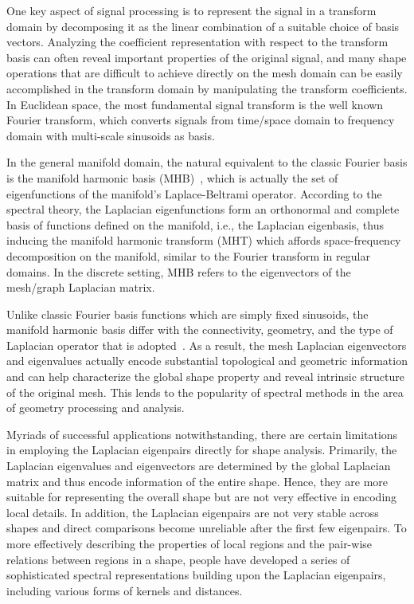 One key aspect of signal processing is to represent the signal in a transform
domain by decomposing it as the linear combination of a suitable choice of basis
vectors. Analyzing the coefficient representation with respect to the transform
basis can often reveal important properties of the original signal, and many
shape operations that are difficult to achieve directly on the mesh domain
can be easily accomplished in the transform domain by manipulating the
transform coefficients. In Euclidean space, the most fundamental signal transform
is the well known Fourier transform, which converts signals from time/space domain to
frequency domain with multi-scale sinusoids as basis.

In the general manifold domain, the natural equivalent to the classic Fourier basis is
the manifold harmonic basis (MHB)~\cite{Vallet2008}, which is actually the set
of eigenfunctions of the manifold's Laplace-Beltrami operator.
According to the spectral theory, the Laplacian eigenfunctions form an orthonormal and complete
basis of functions defined on the manifold, i.e., the Laplacian eigenbasis, thus inducing the
manifold harmonic transform (MHT) which affords space-frequency decomposition on the manifold, similar
to the Fourier transform in regular domains. In the discrete setting, MHB refers to the eigenvectors
of the mesh/graph Laplacian matrix.

Unlike classic Fourier basis functions which are simply fixed sinusoids, the manifold harmonic basis
differ with the connectivity, geometry, and the type of Laplacian operator that is adopted~\cite{Zhang:2010:CGF}.
As a result, the mesh Laplacian eigenvectors and eigenvalues actually encode substantial topological and
geometric information and can help characterize the global shape property and reveal intrinsic structure of the
original mesh. This lends to the popularity of spectral methods in
the area of geometry processing and analysis.

Myriads of successful applications notwithstanding, there are certain limitations in employing the Laplacian
eigenpairs directly for shape analysis. Primarily, the Laplacian eigenvalues and eigenvectors are determined
by the global Laplacian matrix and thus encode information of the entire shape. Hence, they are more suitable
for representing the overall shape but are not very effective in encoding local details. In addition, the Laplacian
eigenpairs are not very stable across shapes and direct comparisons become unreliable after the first few eigenpairs.
To more effectively describing the properties of local regions and the pair-wise relations between regions
in a shape, people have developed a series of sophisticated spectral representations building upon the
Laplacian eigenpairs, including various forms of kernels and distances.

